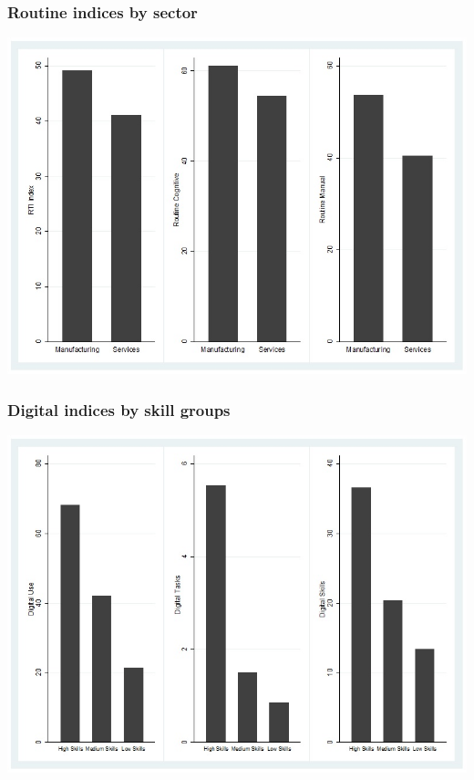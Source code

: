 \documentclass[10pt,xcolor={usenames,dvipsnames}]{beamer}
\begin{document}
\begin{frame} 
\frametitle{Routine indices by sector}
\centering
\includegraphics[width=\linewidth,height=0.8\textheight,keepaspectratio]{Figures/2_routine_sector.jpg}
\end{frame}

\begin{frame}
\frametitle{Digital indices by skill groups}
\centering
\includegraphics[width=\linewidth,height=0.8\textheight,keepaspectratio]{Figures/3_digital_skills.jpg}
\end{frame}
\end{document}

